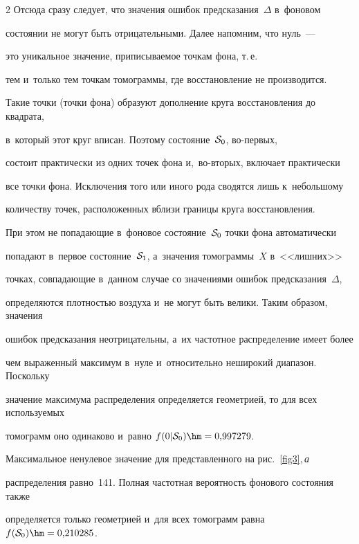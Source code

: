 \begin{multicols}{2}
Отсюда сразу следует, что значения ошибок предсказания~$\Delta$  в~фоновом 

состоянии не могут быть отрицательными. Далее напомним, что нуль~--- 

это уникальное значение, приписываемое точкам фона, т.\,е.\ 

тем и~только тем точкам томограммы, где вос\-ста\-нов\-ле\-ние не производится. 

Такие точки (точки фона) образуют дополнение круга восстановления до квадрата, 

в~который этот круг вписан. Поэтому состояние~${\cal S}_0$, во-пер\-вых, 

состоит практически из одних точек фона и,~во-вто\-рых, включает практически 

все точки фона. Исключения того или иного рода сводятся лишь к~небольшому 

количеству точек, расположенных вблизи границы круга восстановления. 

При этом не попадающие в~фоновое состояние~${\cal S}_0$ точки фона автоматически 

попадают в~первое состояние~${\cal S}_1$, а~значения томограммы~$X$ в~<<лишних>> 

точках, совпадающие в~данном случае со значениями ошибок предсказания~$\Delta$, 

определяются плот\-ностью воздуха и~не могут быть велики. Таким образом, значения 

ошибок предсказания неотрицательны, а~их частотное распределение имеет более 

чем выраженный максимум в~нуле и~относительно неширокий диапазон. Поскольку 

значение максимума распределения определяется геометрией, то для всех используемых 

томограмм оно одинаково и~равно $f(0|{\cal S}_0)\hm= 0{,}997279$. 

Максимальное ненулевое значение для представленного на рис.~\ref{fig3},\,\textit{а} 

распределения равно~141. Полная частотная вероятность фонового состояния также 

определяется только геометрией и~для всех томограмм равна $f({\cal S}_0)\hm= 

0{,}210285$.

{



}








\end{multicols}
